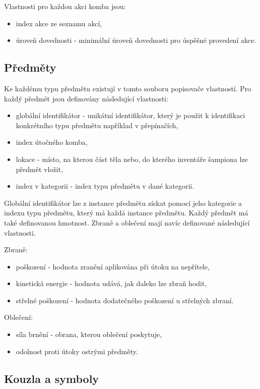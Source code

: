 Vlastnosti pro každou akci komba jsou:
\begin{itemize}
\item index akce ze seznamu akcí, 
\item úroveň dovednosti - minimální úroveň dovednosti pro úspěšné provedení akce. 
\end{itemize}


\subsection{Předměty}\label{item-descriptors}

Ke každému typu předmětu existují v tomto souboru popisovače vlastností\cite{DMItemDescriptors}.
Pro každý předmět jsou definovány následující vlastnosti:  
\begin{itemize}
\item globální identifikátor - unikátní identifikátor, který je použit k identifikaci konkrétního typu předmětu například v přepínačích,
\item index útočného komba,
\item lokace - místo, na kterou část těla nebo, do kterého inventáře šampiona lze předmět vložit,
\item index v kategorii - index typu předmětu v dané kategorii.
\end{itemize}

Globální identifikátor lze z instance předmětu získat pomocí jeho kategorie a indexu typu předmětu,
který má každá instance předmětu. Každý předmět má také definovanou hmotnost. Zbraně a oblečení mají navíc
definované následující vlastnosti\cite{DMItems}.

Zbraně:
\begin{itemize}
\item poškození - hodnota zranění aplikována při útoku na nepřítele,
\item kinetická energie - hodnota udává, jak daleko lze zbraň hodit,
\item střelné poškození - hodnota dodatečného poškození u střelných zbraní.
\end{itemize}

Oblečení:
\begin{itemize}
\item síla brnění - obrana, kterou oblečení poskytuje, 
\item odolnost proti útoky ostrými předměty. 
\end{itemize}

\subsection{Kouzla a symboly}\label{magic-symbols}

